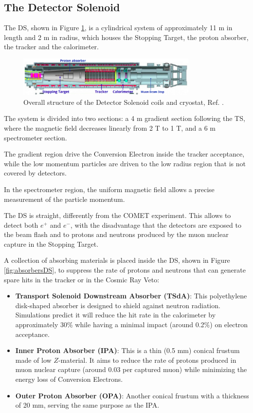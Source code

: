 \subsection{The Detector Solenoid}\label{detectorsolenoid}
The DS, shown in Figure \ref{fig:DS}, is a cylindrical system of approximately 11 m in 
length and 2 m in radius, which houses the Stopping Target, 
the proton absorber, the tracker and the calorimeter. 
\begin{figure}[!h]
    \centering
    \includegraphics[width =0.8\textwidth]{figures/png/Screenshot_20240306_225639.png}
    \caption[The structure of the Detector Solenoid coils and cryostat.]{Overall structure of the Detector Solenoid coils and cryostat, Ref. \cite{bobbb}.}
    \label{fig:DS}
    \end{figure}
The system is divided into two sections: a 4 m gradient section following the TS, 
where the magnetic field decreases linearly from 2 T to 1 T, and a 6 
m spectrometer section. 

The gradient region drive the Conversion Electron 
inside the tracker acceptance, while the low momentum particles 
are driven to the low radius region that is not covered by detectors.  

In the spectrometer region, the uniform magnetic field allows a precise 
measurement of the particle momentum. 

The DS is straight, differently from the COMET experiment. This allows 
to detect both $e^+$ and $e^-$, with the disadvantage that the detectors are exposed to the 
beam flash and to protons and neutrons produced by the muon
nuclear capture in the Stopping Target.

A collection of absorbing materials is placed inside the DS, shown in 
Figure \ref{fig:absorbersDS}, to suppress 
the rate of protons and neutrons that can generate spare hits in the 
tracker or in the Cosmic Ray Veto:
\begin{itemize}
    \item \textbf{Transport Solenoid Downstream Absorber (TSdA)}: This 
    polyethylene disk-shaped absorber is designed to shield against neutron radiation. 
    Simulations predict it will reduce the hit rate in the calorimeter by approximately 30\% 
    while having a minimal impact (around 0.2\%) on electron acceptance.
    \item \textbf{Inner Proton Absorber (IPA)}: This is a thin (0.5 mm) conical 
    frustum made of low $Z$-material. It aims to reduce the rate of protons produced 
    in muon nuclear capture (around 0.03 per captured muon) while minimizing the 
    energy loss of Conversion Electrons.
    \item \textbf{Outer Proton Absorber (OPA)}: Another conical frustum with a 
    thickness of 20 mm, serving the same purpose as the IPA.
\end{itemize}


